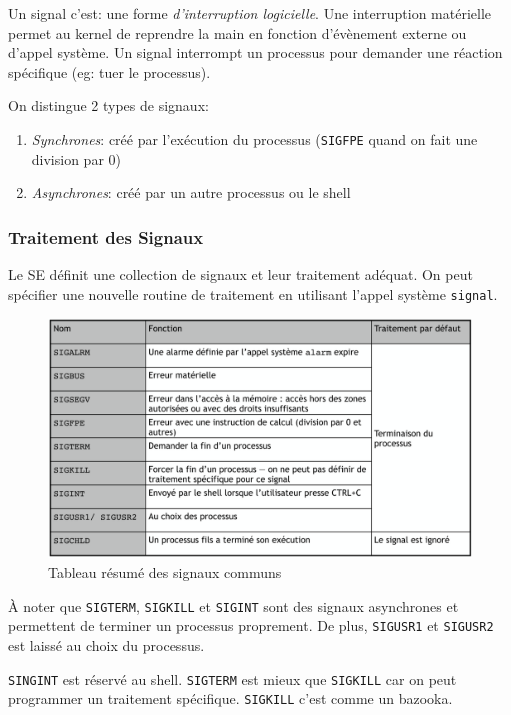 Un signal c'est: une forme \emph{d'interruption logicielle}. Une
interruption matérielle permet au kernel de reprendre la main en
fonction d'évènement externe ou d'appel système. Un signal interrompt un
processus pour demander une réaction spécifique (eg: tuer le processus).

On distingue 2 types de signaux:

\begin{enumerate}
\def\labelenumi{\arabic{enumi}.}
\tightlist
\item
  \emph{Synchrones}: créé par l'exécution du processus (\texttt{SIGFPE}
  quand on fait une division par 0)
\item
  \emph{Asynchrones}: créé par un autre processus ou le shell
\end{enumerate}

\subsubsection{Traitement des Signaux}\label{traitement-des-signaux}

Le SE définit une collection de signaux et leur traitement adéquat. On
peut spécifier une nouvelle routine de traitement en utilisant l'appel
système \texttt{signal}.

\begin{figure}
\centering
\includegraphics{image-64.png}
\caption{Tableau résumé des signaux communs}
\end{figure}

À noter que \texttt{SIGTERM}, \texttt{SIGKILL} et \texttt{SIGINT} sont
des signaux asynchrones et permettent de terminer un processus
proprement. De plus, \texttt{SIGUSR1} et \texttt{SIGUSR2} est laissé au
choix du processus.

\texttt{SINGINT} est réservé au shell. \texttt{SIGTERM} est mieux que
\texttt{SIGKILL} car on peut programmer un traitement spécifique.
\texttt{SIGKILL} c'est comme un bazooka.

